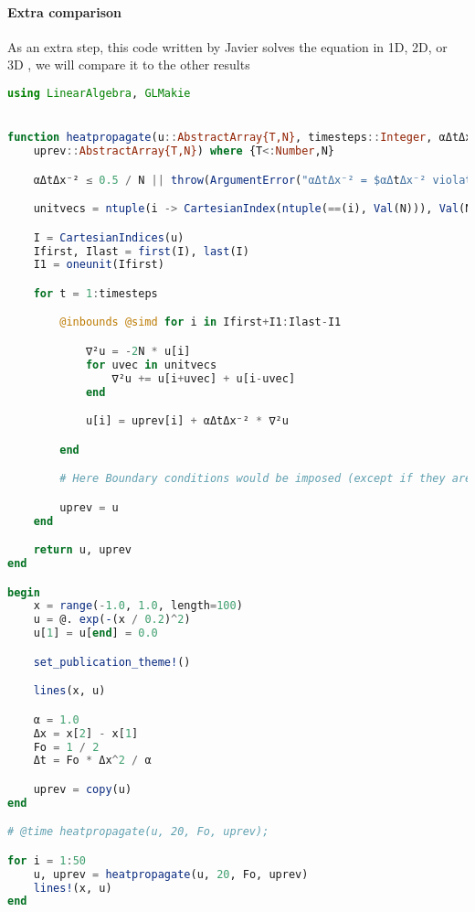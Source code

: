 \clearpage
\paragraph{Extra comparison}

As an extra step, this code written by Javier solves the equation in 1D, 2D, or 3D , we will compare it to the other results 



\begin{lstlisting}[language=Julia]
using LinearAlgebra, GLMakie


function heatpropagate(u::AbstractArray{T,N}, timesteps::Integer, αΔtΔx⁻²::Real,
    uprev::AbstractArray{T,N}) where {T<:Number,N}

    αΔtΔx⁻² ≤ 0.5 / N || throw(ArgumentError("αΔtΔx⁻² = $αΔtΔx⁻² violates Fourier stability condition"))

    unitvecs = ntuple(i -> CartesianIndex(ntuple(==(i), Val(N))), Val(N))

    I = CartesianIndices(u)
    Ifirst, Ilast = first(I), last(I)
    I1 = oneunit(Ifirst)

    for t = 1:timesteps

        @inbounds @simd for i in Ifirst+I1:Ilast-I1

            ∇²u = -2N * u[i]
            for uvec in unitvecs
                ∇²u += u[i+uvec] + u[i-uvec]
            end

            u[i] = uprev[i] + αΔtΔx⁻² * ∇²u

        end

        # Here Boundary conditions would be imposed (except if they are Dirichlet at boundary)

        uprev = u
    end

    return u, uprev
end

begin
    x = range(-1.0, 1.0, length=100)
    u = @. exp(-(x / 0.2)^2)
    u[1] = u[end] = 0.0

    set_publication_theme!()

    lines(x, u)

    α = 1.0
    Δx = x[2] - x[1]
    Fo = 1 / 2
    Δt = Fo * Δx^2 / α

    uprev = copy(u)
end

# @time heatpropagate(u, 20, Fo, uprev);

for i = 1:50
    u, uprev = heatpropagate(u, 20, Fo, uprev)
    lines!(x, u)
end

\end{lstlisting}



